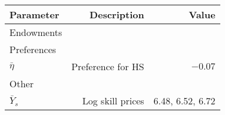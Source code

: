 \begin{tabular}{lrr}
\hline
Parameter & Description  & Value  \\ 
\hline
Endowments &   &   \\ 
Preferences &   &   \\ 
$\bar{\eta}$ & Preference for HS  & $-0.07$  \\ 
Other &   &   \\ 
$\bar{Y}_{s}$ & Log skill prices  & 6.48, 6.52, 6.72  \\ 
\hline
\end{tabular}%
